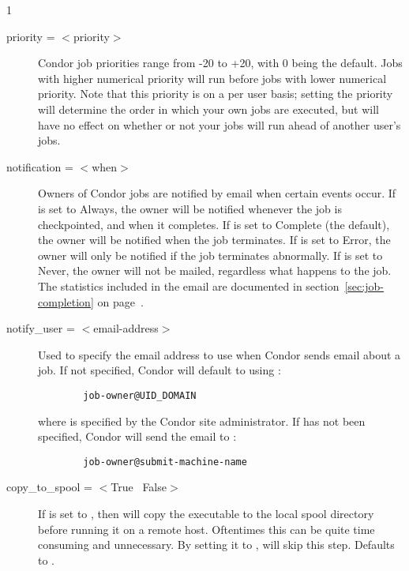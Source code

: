 \begin{ManPage}{\label{man-condor-submit}}{1}
\begin{description}

\item[priority = $<$priority$>$] Condor job priorities range from -20 to
+20, with 0 being the default. Jobs with higher numerical priority will
run before jobs with lower numerical priority. Note that this priority
is on a per user basis; setting the priority will determine the order in
which your own jobs are executed, but will have no effect on whether or
not your jobs will run ahead of another user's jobs. 


\item[notification = $<$when$>$]\label{man-condor-submit-notification} Owners of Condor jobs are notified by
email when certain events occur.
If  is set to \mbox{Always}, the owner will be notified
whenever the job is checkpointed, and when it completes.
If  is set to \mbox{Complete} (the default), the owner will
be notified when the job terminates.
If  is set to \mbox{Error}, the owner will only be notified
if the job terminates abnormally.
If  is set to \mbox{Never}, the owner will not be mailed,
regardless what happens to the job.
The statistics included in the email are documented in
section~\ref{sec:job-completion} on
page~\pageref{sec:job-completion}.


\item[notify\_user = $<$email-address$>$]\label{man-condor-submit-notify-user} Used to specify the email
address to use when Condor sends email about a job.  If not specified,
Condor will default to using :
\begin{verbatim}
        job-owner@UID_DOMAIN
\end{verbatim}
where  is specified by the Condor site administrator.  If 
 has not been specified, Condor will send the email
to :
\begin{verbatim}
        job-owner@submit-machine-name
\end{verbatim}


\item[copy\_to\_spool = $<$True \Bar\ False$>$] If  is set to
, then  will copy the executable to the local spool 
directory before running it on a remote host. Oftentimes this can be quite
time consuming and unnecessary. By setting it to , 
will skip this step.  Defaults to .


\end{description}
\end{ManPage}
